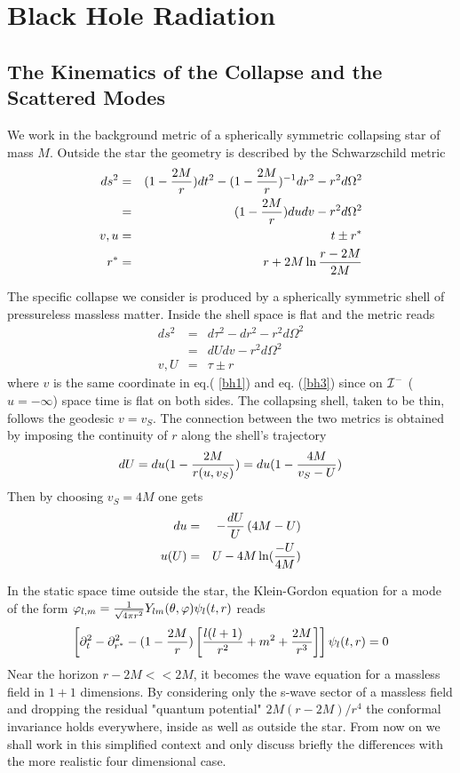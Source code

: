 \section{Black Hole Radiation}
\subsection{The Kinematics of the Collapse and the Scattered Modes}


We work in the background metric of a spherically symmetric
collapsing
star of mass $M$. Outside the star the geometry is described  by the
Schwarzschild metric
\begin{eqnarray}
ds^2 &=& (1- {2 M \over r}) dt^2 - (1- {2 M
\over r})^{-1} dr^2 - r^2 d \Omega^2 \nonumber\\
&=& (1- {2 M \over r}) du dv -r^2 d \Omega^2 \nonumber\\
v,u &=& t \pm r^*\nonumber\\
r^* &=& r + 2M \ln{ r-2M \over 2M}
\label{bh1}
\end{eqnarray}

The specific  collapse we consider is
produced by a spherically symmetric shell of pressureless
massless matter. Inside the shell space is
flat and the metric reads
\begin{eqnarray}
ds^2 &=& d \tau ^2 - dr^2 - r^2 d \Omega^2 \nonumber\\
&=& dU dv -r^2 d \Omega^2 \nonumber\\
v,U &=& \tau \pm r
\label{bh3}
\end{eqnarray}
where $v$ is the same coordinate in eq.( \ref{bh1}) and eq. (\ref{bh3})
since on ${\cal I}^-$ ($u=-\infty$) space time is flat on both sides.
The collapsing shell, taken to be thin, follows the geodesic $v=v_S$.
The connection between the two metrics is obtained by imposing the
continuity of $r$ along the shell's trajectory
\begin{equation}
dU = du (1 - {2 M \over r(u,v_S)}) = du (1 - {4 M \over v_S - U})
\end{equation}
Then by choosing $v_S=4M$ one gets
\begin{eqnarray}
du &=& - { dU \over U} \left( 4M - U
\right)
\nonumber\\  u(U) &=& U - 4M \ln ({- U \over 4M})
\label{162s}
\end{eqnarray}

In the static space time outside the star, the Klein-Gordon equation
for a mode of the form $ \varphi_{l,m}
= {1 \over \sqrt {4 \pi r^2}} Y_{lm}(\theta, \varphi)
\psi_{l}(t,r)
$
reads
\begin{equation}
\left[ \partial_t^2 -\partial_{r^*}^2 - (1- {2 M \over
r}) \left[ {l(l+1) \over r^2} + m^2 + { 2 M \over r^3} \right] \right]
\psi_l
(t,r) =0
\label{bh2}
\end{equation}
Near the horizon $r-2M << 2M$, it  becomes the wave equation
for a massless field
in $1+1$
dimensions.
By considering
only
the s-wave sector of
a massless field
and dropping the
residual
 "quantum potential" ${2M(r-2M) / r^4}$ the
conformal invariance holds everywhere, inside as well as outside
the
star.
 From now  on we shall work in this simplified
context and only discuss
briefly the differences with the more realistic four dimensional case.

